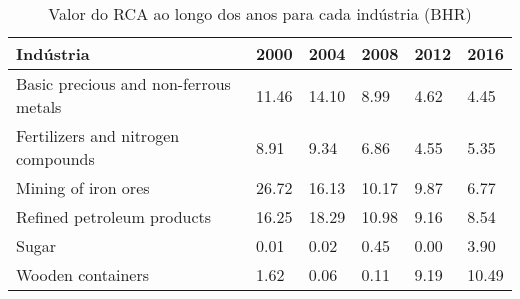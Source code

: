 \begin{table}
\centering
\caption{Valor do RCA ao longo dos anos para cada indústria (BHR)}
\label{tab:ex3-tempo-BHR}
\begin{tabular}{p{6cm}p{1.5cm}p{1.5cm}p{1.5cm}p{1.5cm}p{1.5cm}}
\toprule
                            Indústria &  2000 &  2004 &  2008 & 2012 &  2016 \\
\midrule
Basic precious and non-ferrous metals & 11.46 & 14.10 &  8.99 & 4.62 &  4.45 \\
   Fertilizers and nitrogen compounds &  8.91 &  9.34 &  6.86 & 4.55 &  5.35 \\
                  Mining of iron ores & 26.72 & 16.13 & 10.17 & 9.87 &  6.77 \\
           Refined petroleum products & 16.25 & 18.29 & 10.98 & 9.16 &  8.54 \\
                                Sugar &  0.01 &  0.02 &  0.45 & 0.00 &  3.90 \\
                    Wooden containers &  1.62 &  0.06 &  0.11 & 9.19 & 10.49 \\
\bottomrule
\end{tabular}
\end{table}
